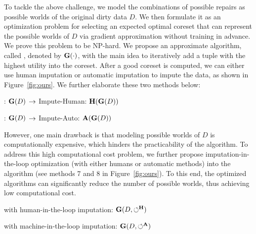 To tackle the above challenge, we model the combinations of possible repairs as possible worlds of the original dirty data $D$. 
We then formulate it as an optimization problem for selecting an expected optimal coreset that can represent the  possible worlds of $D$ via gradient approximation without training in advance. We prove this problem to be NP-hard. We propose an approximate algorithm, called \ours, denoted by $\mathbf{G}(\cdot)$, with the main idea to iteratively add a tuple with the highest utility  into the coreset. 
After a good coreset is computed, we can either use human imputation or automatic imputation to impute the data, as shown in Figure~\ref{fig:ours}.
We further elaborate these two methods below:

\bi
	\item[(5)] \ours: $\mathbf{G}(D)$ $\rightarrow$ Impute-Human: $\mathbf{H}(\mathbf{G}(D))$
	\item[(6)] \ours: $\mathbf{G}(D)$ $\rightarrow$ Impute-Auto: $\mathbf{A}(\mathbf{G}(D))$
\ei

However, one main drawback is that modeling possible worlds of $D$ is computationally expensive, which hinders the practicability of the \ours algorithm.  To address this high computational cost problem, we further propose  imputation-in-the-loop optimization (with either humans or automatic methods) into the \ours algorithm (see methods 7 and 8 in Figure~\ref{fig:ours}). To this end, the optimized algorithms can significantly reduce the number of possible worlds, thus achieving low computational cost. 

\bi
	\item[(7)] \ours with human-in-the-loop imputation: $\mathbf{G}(D, \circlearrowleft^\mathbf{H})$ 
	\item[(8)] \ours with machine-in-the-loop imputation: $\mathbf{G}(D, \circlearrowleft^\mathbf{A})$
\ei








